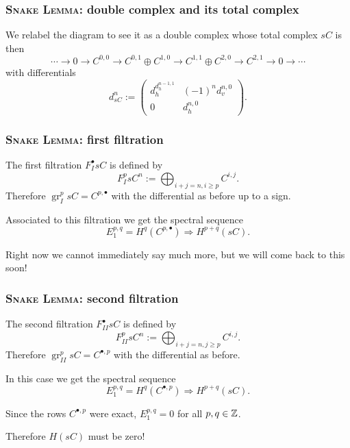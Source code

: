 \documentclass[notheorems, hyperref={backref}]{beamer}
\theoremstyle{plain}
\theoremstyle{definition}
\theoremstyle{darkredexample}
\theoremstyle{remark}
\DeclareMathOperator{\gr}{gr}
\newcommand{\op}{\oplus}
\begin{document}
\begin{frame}
    \frametitle{\textsc{Snake Lemma}: double complex and its total complex}
    We relabel the diagram to see it as a double complex
    \pause
    whose total complex $sC$ is then
    \[ \cdots \to 0\to C^{0,0}\to C^{0,1}\op C^{1,0}\to C^{1,1}\op C^{2,0}\to C^{2,1}\to 0\to \cdots \]
    with differentials
    \[ d_{sC}^{n}:=\begin{pmatrix}
	d_{h}^{d_{h}^{n-1,1}} & (-1)^{n}d_{v}^{n,0} \\
	0 & d_{h}^{n,0}
    \end{pmatrix}.
    \]
\end{frame}

\begin{frame}
    \frametitle{\textsc{Snake Lemma}: first filtration}
    The first filtration $F_{I}^{\bullet}sC$ is defined by
    \[ F_{I}^{p}sC^{n}:=\bigoplus_{i+j=n,i\geqslant p} C^{i,j}. \]
    \pause
    Therefore $\gr_{I}^{p}sC=C^{p,\bullet}$ with the differential as before up to a sign.
    \pause

    Associated to this filtration we get the spectral sequence
    \[ E_{1}^{p,q}=H^{q}(C^{p,\bullet})\Rightarrow H^{p+q}(sC). \]
    \pause

    Right now we cannot immediately say much more, but we will come back to this soon!
\end{frame}

\begin{frame}
    \frametitle{\textsc{Snake Lemma}: second filtration}
    The second filtration $F_{II}^{\bullet}sC$ is defined by
    \[ F_{II}^{p}sC^{n}:=\bigoplus_{i+j=n,j\geqslant p} C^{i,j}. \]
    \pause
    Therefore $\gr_{II}^{p}sC=C^{\bullet,p}$ with the differential as before.
    \pause

    In this case we get the spectral sequence
    \[ E_{1}^{p,q}=H^{q}(C^{\bullet,p})\Rightarrow H^{p+q}(sC). \]
    \pause

    Since the rows $C^{\bullet,p}$ were exact, $E_{1}^{p,q}=0$ for all $p,q\in \mathbb{Z}$.
    \pause

    Therefore $H(sC)$ must be zero!
\end{frame}
\end{document}
